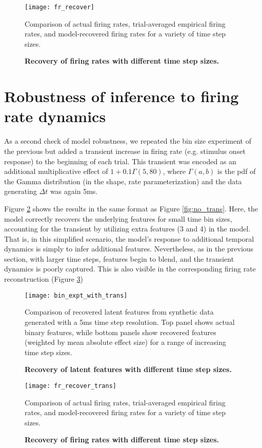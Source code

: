 \documentclass[10pt,letterpaper]{article}
\begin{document}
\begin{figure}[!ht]
    \texttt{[image: fr\_recover]}
	\caption{\bf Recovery of firing rates with different time step sizes.}
    Comparison of actual firing rates, trial-averaged empirical firing rates, and model-recovered firing rates for a variety of time step sizes.
	\label{fig:no_trans_fr}
\end{figure}

\section*{Robustness of inference to firing rate dynamics}
As a second check of model robustness, we repeated the bin size experiment of the previous but added a transient increase in firing rate (e.g. stimulus onset response) to the beginning of each trial. This transient was encoded as an additional multiplicative effect of $1 + 0.1\Gamma(5, 80)$, where $\Gamma(a, b)$ is the pdf of the Gamma distribution (in the shape, rate parameterization) and the data generating $\Delta t$ was again 5ms.

Figure \ref{fig:with_trans} shows the results in the same format as Figure \ref{fig:no_trans}. Here, the model correctly recovers the underlying features for small time bin sizes, accounting for the transient by utilizing extra features (3 and 4) in the model. That is, in this simplified scenario, the model's response to additional temporal dynamics is simply to infer additional features. Nevertheless, as in the previous section, with larger time steps, features begin to blend, and the transient dynamics is poorly captured. This is also visible in the corresponding firing rate reconstruction (Figure \ref{fig:with_trans_fr})

\begin{figure}[!ht]
    \texttt{[image: bin\_expt\_with\_trans]}
	\caption{\bf Recovery of latent features with different time step sizes.}
    Comparison of recovered latent features from synthetic data generated with a 5ms time step resolution. Top panel shows actual binary features, while bottom panels show recovered features (weighted by mean absolute effect size) for a range of increasing time step sizes.
	\label{fig:with_trans}
\end{figure}

\begin{figure}[!ht]
    \texttt{[image: fr\_recover\_trans]}
	\caption{\bf Recovery of firing rates with different time step sizes.}
    Comparison of actual firing rates, trial-averaged empirical firing rates, and model-recovered firing rates for a variety of time step sizes.
	\label{fig:with_trans_fr}
\end{figure}
\end{document}
